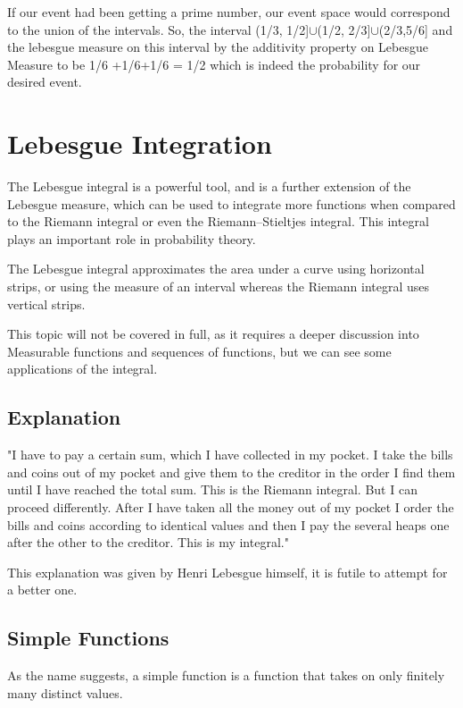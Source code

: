 \documentclass{article}
\begin{document}
\begin{enumerate}
If our event had been getting a prime number, our event space would correspond to the union of the intervals. So, the interval (1/3, 1/2]$\cup$(1/2, 2/3]$\cup$(2/3,5/6] and the lebesgue measure on this interval by the additivity property on Lebesgue Measure to be 1/6 +1/6+1/6 = 1/2 which is indeed the probability for our desired event.\newline

\end{enumerate}
\newpage
\section{Lebesgue Integration}

The Lebesgue integral is a powerful tool, and is a further extension of the Lebesgue measure, which can be used to integrate more functions when compared to the Riemann integral or even the Riemann–Stieltjes integral. 
This integral plays an important role in probability theory.

The Lebesgue integral approximates the area under a curve using horizontal strips, or using the measure of an interval whereas the Riemann integral uses vertical strips.

This topic will not be covered in full, as it requires a deeper discussion into Measurable functions and sequences of functions, but we can see some applications of the integral.

\subsection{Explanation}

\begin{center}
    "I have to pay a certain sum, which I have collected in my pocket. I take the bills and coins out of my pocket and give them to the creditor in the order I find them until I have reached the total sum. This is the Riemann integral. But I can proceed differently. After I have taken all the money out of my pocket I order the bills and coins according to identical values and then I pay the several heaps one after the other to the creditor. This is my integral."
\end{center}

This explanation was given by Henri Lebesgue himself, it is futile to attempt for a better one.

\subsection{Simple Functions}
As the name suggests, a simple function is a function that takes on only finitely many distinct values. 
\end{document}

